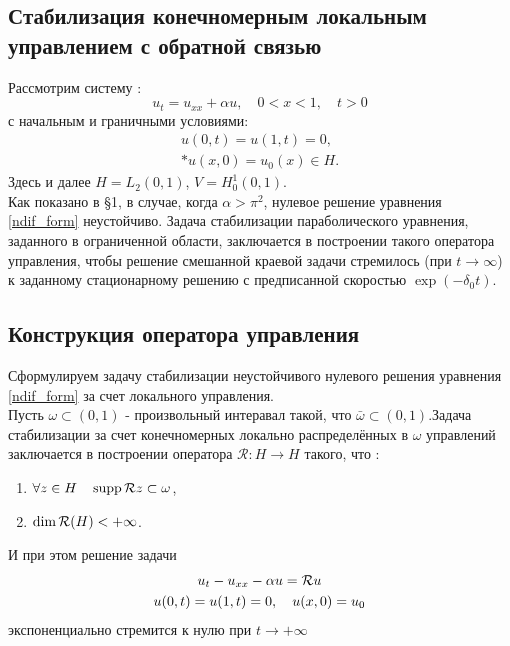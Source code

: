 \subsection{Стабилизация конечномерным локальным управлением с обратной связью}
Рассмотрим систему :
\begin{equation}\label{ndif_form}
u_t = u_{xx} + \alpha u, \quad 0 < x < 1, \quad t > 0
\end{equation}
с начальным и граничными условиями:
\begin{gather}
u(0, t) = u(1, t) = 0, \\*
u(x, 0) = u_{0}(x) \in H .\nonumber
\end{gather}
Здесь и далее $H = L_2(0, 1)$, $V = H^1_0(0, 1)$.\\
Как показано в \S 1, в случае, когда $\alpha > \pi^2$, нулевое решение уравнения \eqref{ndif_form} неустойчиво.
Задача стабилизации параболического уравнения, заданного в ограниченной области, заключается в построении такого оператора управления, чтобы решение смешанной краевой задачи стремилось (при $t \rightarrow \infty$) к заданному стационарному решению с предписанной скоростью $\exp (-\delta_0t)$.

\subsection{Конструкция оператора управления}
Сформулируем задачу стабилизации неустойчивого нулевого решения уравнения \eqref{ndif_form} за счет локального управления.\\

Пусть $\omega \subset (0, 1)$ - произвольный интеравал такой, что $\bar{\omega} \subset (0, 1)$.Задача стабилизации за счет конечномерных локально распределённых в $\omega$ управлений заключается в построении оператора $\mathcal{R} : H \rightarrow H$ такого, что :
\begin{enumerate}
\item $\forall z \in H \quad \mathop{\mathrm{supp}} \mathcal{R}{z} \subset \omega$,
\item $\dim \mathcal{R}{(H)} < +\infty$.
\end{enumerate}
И при этом решение задачи
\begin{gather}
u_t - u_{xx} - \alpha u = \mathcal{R}{u} \nonumber\\
u(0, t) = u(1, t) = 0, \quad u(x, 0) = u_0 \nonumber
\end{gather}
экспоненциально стремится к нулю при $t \rightarrow + \infty$\\

